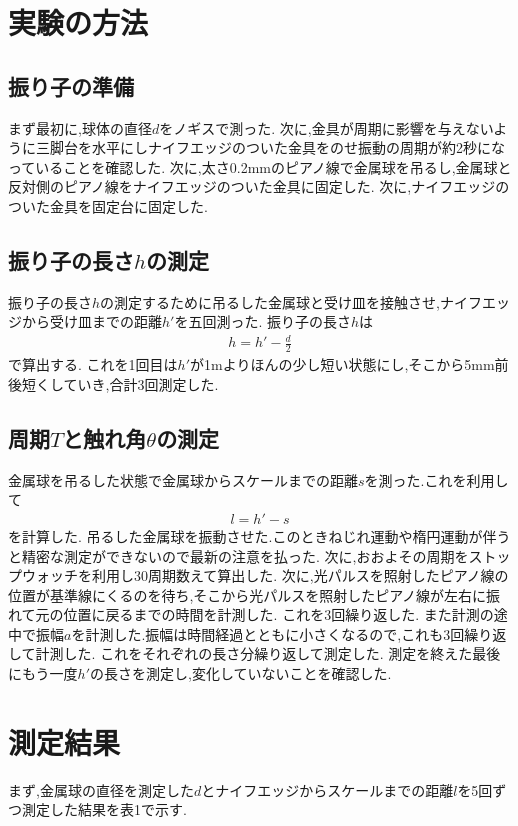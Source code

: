 \documentclass[a4j,10pt]{jarticle}
\begin{document}
  \section{実験の方法}
  \subsection{振り子の準備}
  まず最初に,球体の直径$d$をノギスで測った.
  次に,金具が周期に影響を与えないように三脚台を水平にしナイフエッジのついた金具をのせ振動の周期が約2秒になっていることを確認した.
  次に,太さ0.2mmのピアノ線で金属球を吊るし,金属球と反対側のピアノ線をナイフエッジのついた金具に固定した.
  次に,ナイフエッジのついた金具を固定台に固定した.
  \subsection{振り子の長さ$h$の測定}
  振り子の長さ$h$の測定するために吊るした金属球と受け皿を接触させ,ナイフエッジから受け皿までの距離$h'$を五回測った.
  振り子の長さ$h$は
    \begin{eqnarray}
      h = h'-\frac{d}{2}
    \end{eqnarray}
  で算出する.
  これを1回目は$h'$が1mよりほんの少し短い状態にし,そこから5mm前後短くしていき,合計3回測定した.
  \subsection{周期$T$と触れ角$\theta$の測定}
  金属球を吊るした状態で金属球からスケールまでの距離$s$を測った.これを利用して
  \begin{eqnarray}
    l = h'-s
  \end{eqnarray}
  を計算した.
  吊るした金属球を振動させた.このときねじれ運動や楕円運動が伴うと精密な測定ができないので最新の注意を払った.
  次に,おおよその周期をストップウォッチを利用し30周期数えて算出した.
  次に,光パルスを照射したピアノ線の位置が基準線にくるのを待ち,そこから光パルスを照射したピアノ線が左右に振れて元の位置に戻るまでの時間を計測した.
  これを3回繰り返した.
  また計測の途中で振幅$a$を計測した.振幅は時間経過とともに小さくなるので,これも3回繰り返して計測した.
  これをそれぞれの長さ分繰り返して測定した.
  測定を終えた最後にもう一度$h'$の長さを測定し,変化していないことを確認した.
  \section{測定結果}
  まず,金属球の直径を測定した$d$とナイフエッジからスケールまでの距離$l$を5回ずつ測定した結果を表1で示す.
\end{document}
